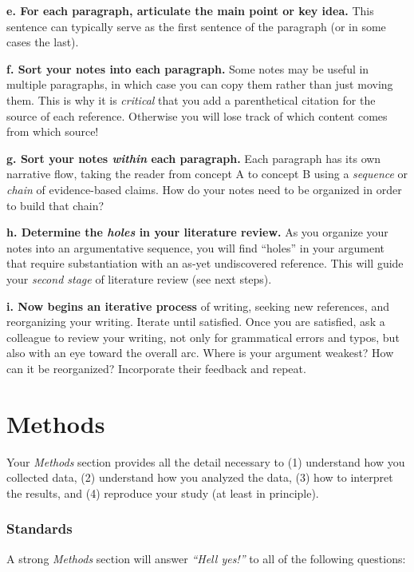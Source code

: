 \documentclass[]{book}
\begin{document}
\textbf{e. For each paragraph, articulate the main point or key idea.} This sentence can typically serve as the first sentence of the paragraph (or in some cases the last).

\textbf{f. Sort your notes into each paragraph.} Some notes may be useful in multiple paragraphs, in which case you can copy them rather than just moving them. This is why it is \emph{critical} that you add a parenthetical citation for the source of each reference. Otherwise you will lose track of which content comes from which source!

\textbf{g. Sort your notes \emph{within} each paragraph.} Each paragraph has its own narrative flow, taking the reader from concept A to concept B using a \emph{sequence} or \emph{chain} of evidence-based claims. How do your notes need to be organized in order to build that chain?

\textbf{h. Determine the \emph{holes} in your literature review.} As you organize your notes into an argumentative sequence, you will find ``holes'' in your argument that require substantiation with an as-yet undiscovered reference. This will guide your \emph{second stage} of literature review (see next steps).

\textbf{i. Now begins an iterative process} of writing, seeking new references, and reorganizing your writing. Iterate until satisfied. Once you are satisfied, ask a colleague to review your writing, not only for grammatical errors and typos, but also with an eye toward the overall arc. Where is your argument weakest? How can it be reorganized? Incorporate their feedback and repeat.

\hypertarget{methods}{%
\section*{Methods}\label{methods}}

Your \emph{Methods} section provides all the detail necessary to (1) understand how you collected data, (2) understand how you analyzed the data, (3) how to interpret the results, and (4) reproduce your study (at least in principle).

\hypertarget{standards-2}{%
\subsubsection*{Standards}\label{standards-2}}

A strong \emph{Methods} section will answer \emph{``Hell yes!''} to all of the following questions:
\end{document}
